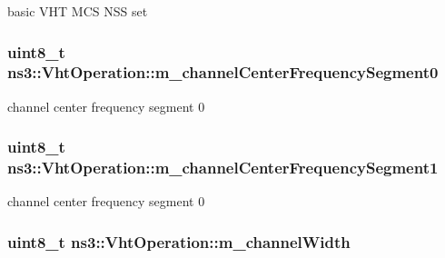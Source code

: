 basic V\+HT M\+CS N\+SS set 

\subsubsection[{\texorpdfstring{m\+\_\+channel\+Center\+Frequency\+Segment0}{m_channelCenterFrequencySegment0}}]{\setlength{\rightskip}{0pt plus 5cm}uint8\+\_\+t ns3\+::\+Vht\+Operation\+::m\+\_\+channel\+Center\+Frequency\+Segment0\hspace{0.3cm}{\ttfamily [private]}}\hypertarget{classns3_1_1VhtOperation_a998cfd8033b2173fb92c6034e58ff1c7}{}\label{classns3_1_1VhtOperation_a998cfd8033b2173fb92c6034e58ff1c7}


channel center frequency segment 0 

\subsubsection[{\texorpdfstring{m\+\_\+channel\+Center\+Frequency\+Segment1}{m_channelCenterFrequencySegment1}}]{\setlength{\rightskip}{0pt plus 5cm}uint8\+\_\+t ns3\+::\+Vht\+Operation\+::m\+\_\+channel\+Center\+Frequency\+Segment1\hspace{0.3cm}{\ttfamily [private]}}\hypertarget{classns3_1_1VhtOperation_a6c064c69fcaeb3a704444df6c0aa08d4}{}\label{classns3_1_1VhtOperation_a6c064c69fcaeb3a704444df6c0aa08d4}


channel center frequency segment 0 

\subsubsection[{\texorpdfstring{m\+\_\+channel\+Width}{m_channelWidth}}]{\setlength{\rightskip}{0pt plus 5cm}uint8\+\_\+t ns3\+::\+Vht\+Operation\+::m\+\_\+channel\+Width\hspace{0.3cm}{\ttfamily [private]}}\hypertarget{classns3_1_1VhtOperation_a0b17991d4eb9a85892904dcd63488d50}{}\label{classns3_1_1VhtOperation_a0b17991d4eb9a85892904dcd63488d50}


